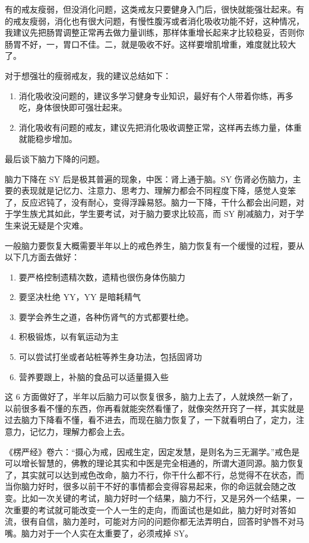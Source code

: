 \documentclass{ctexart}
\begin{document}
有的戒友瘦弱，但没消化问题，这类戒友只要健身入门后，很快就能强壮起来。有的戒友瘦弱，消化也有很大问题，有慢性腹泻或者消化吸收功能不好，这种情况，我建议先把肠胃调整正常再去做力量训练，那样体重增长起来才比较稳妥，否则你肠胃不好，一，胃口不佳。二，就是吸收不好。这样要增肌增重，难度就比较大了。

对于想强壮的瘦弱戒友，我的建议总结如下：

\begin{enumerate}
    \item 消化吸收没问题的，建议多学习健身专业知识，最好有个人带着你练，再多吃，身体很快即可强壮起来。
    \item 消化吸收有问题的戒友，建议先把消化吸收调整正常，这样再去练力量，体重就能稳步增加。
\end{enumerate}

最后谈下脑力下降的问题。

脑力下降在 SY 后是极其普遍的现象，中医：肾上通于脑。SY 伤肾必伤脑力，主要的表现就是记忆力、注意力、思考力、理解力都会不同程度下降，感觉人变笨了，反应迟钝了，没有耐心，变得浮躁易怒。脑力一下降，干什么都会出问题，对于学生族尤其如此，学生要考试，对于脑力要求比较高，而 SY 削减脑力，对于学生来说无疑是个灾难。

一般脑力要恢复大概需要半年以上的戒色养生，脑力恢复有一个缓慢的过程，要从以下几方面去做好：

\begin{enumerate}
    \item 要严格控制遗精次数，遗精也很伤身体伤脑力
    \item 要坚决杜绝 YY，YY 是暗耗精气
    \item 要学会养生之道，各种伤肾气的方式都要杜绝。
    \item 积极锻炼，以有氧运动为主
    \item 可以尝试打坐或者站桩等养生身功法，包括固肾功
    \item 营养要跟上，补脑的食品可以适量摄入些
\end{enumerate}

这 6 方面做好了，半年以后脑力可以恢复很多，脑力上去了，人就焕然一新了，以前很多看不懂的东西，你再看就能突然看懂了，就像突然开窍了一样，其实就是过去脑力下降看不懂，看不进去，而现在脑力恢复了，一下就看明白了，定力，注意力，记忆力，理解力都会上去。

《楞严经》卷六：“摄心为戒，因戒生定，因定发慧，是则名为三无漏学。”戒色是可以增长智慧的，佛教的理论其实和中医是完全相通的，所谓大道同源。脑力恢复了，其实就可以达到戒色改命，脑力不行，你干什么都不行，总觉得不在状态，而当你脑力好时，很多以前干不好的事情都会变得容易起来，你的命运就会随之改变。比如一次关键的考试，脑力好时一个结果，脑力不行，又是另外一个结果，一次重要的考试就可能改变一个人一生的走向，而面试也是如此，脑力好时对答如流，很有自信，脑力差时，可能对方问的问题你都无法弄明白，回答时驴唇不对马嘴。脑力对于一个人实在太重要了，必须戒掉 SY。
\end{document}
